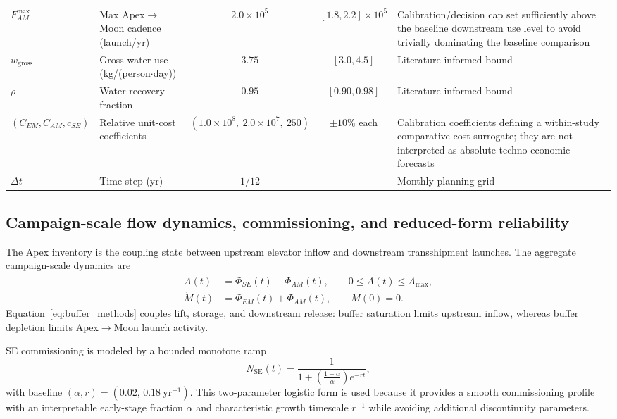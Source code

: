 \documentclass[12pt]{article}
\begin{document}
\begin{table}[htbp]
{\begin{tabular}{@{}l p{2.4cm} c c p{4.2cm}@{}}
			$F_{AM}^{\max}$ & Max Apex$\to$Moon cadence (launch/yr) & $2.0\times 10^5$ & $[1.8,2.2]\times 10^5$ &
			Calibration/decision cap set sufficiently above the baseline downstream use level to avoid trivially dominating the baseline comparison \\
			$w_{\mathrm{gross}}$ & Gross water use (kg/(person$\cdot$day)) & $3.75$ & $[3.0,4.5]$ &
			Literature-informed bound \cite{NASA2023WaterHumanConsumptionTB,NASASTD3001V2RevE2025,NASA2023ECLSSBrief,Williamson2023ISSWater} \\
			$\rho$ & Water recovery fraction & $0.95$ & $[0.90,0.98]$ &
			Literature-informed bound \cite{NASA2023ECLSSBrief,Williamson2023ISSWater} \\
			$(C_{EM},C_{AM},c_{SE})$ & Relative unit-cost coefficients & $(1.0\!\times\!10^8,\ 2.0\!\times\!10^7,\ 250)$ & $\pm 10\%$ each &
			Calibration coefficients defining a within-study comparative cost surrogate; they are not interpreted as absolute techno-economic forecasts \\
			$\Delta t$ & Time step (yr) & $1/12$ & -- &
			Monthly planning grid \\
			\bottomrule
		\end{tabular}%
	}
\end{table}

\subsection{Campaign-scale flow dynamics, commissioning, and reduced-form reliability}
\label{sec:methods_dynamics}

The Apex inventory is the coupling state between upstream elevator inflow and downstream transshipment launches. The aggregate campaign-scale dynamics are
\begin{align}
	\dot A(t) &= \Phi_{SE}(t)-\Phi_{AM}(t), \qquad 0 \leq A(t) \leq A_{\max},
	\label{eq:buffer_methods}\\
	\dot M(t) &= \Phi_{EM}(t)+\Phi_{AM}(t), \qquad M(0)=0.
	\label{eq:mass_methods}
\end{align}
Equation~\eqref{eq:buffer_methods} couples lift, storage, and downstream release: buffer saturation limits upstream inflow, whereas buffer depletion limits Apex$\to$Moon launch activity.

SE commissioning is modeled by a bounded monotone ramp
\begin{equation}
	N_{\mathrm{SE}}(t)=\frac{1}{1+\left(\frac{1-\alpha}{\alpha}\right)e^{-rt}},
	\label{eq:logistic_ramp}
\end{equation}
with baseline $(\alpha,r)=(0.02,\,0.18~\mathrm{yr}^{-1})$. This two-parameter logistic form is used because it provides a smooth commissioning profile with an interpretable early-stage fraction $\alpha$ and characteristic growth timescale $r^{-1}$ while avoiding additional discontinuity parameters.
\end{document}
